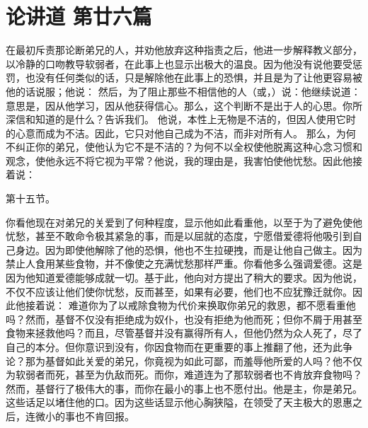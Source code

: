 
\section{论讲道 第廿六篇}

\par

 \par

在最初斥责那论断弟兄的人，并劝他放弃这种指责之后，他进一步解释教义部分，以冷静的口吻教导软弱者，在此事上也显示出极大的温良。因为他没有说他要受惩罚，也没有任何类似的话，只是解除他在此事上的恐惧，并且是为了让他更容易被他的话说服；他说： 然后，为了阻止那些不相信他的人（或，）说：他继续说道： 意思是，因从他学习，因从他获得信心。那么，这个判断不是出于人的心思。你所深信和知道的是什么？告诉我们。 他说，本性上无物是不洁的，但因人使用它时的心意而成为不洁。因此，它只对他自己成为不洁，而非对所有人。 那么，为何不纠正你的弟兄，使他认为它不是不洁的？为何不以全权使他脱离这种心念习惯和观念，使他永远不将它视为平常？他说，我的理由是，我害怕使他忧愁。因此他接着说：\par

第十五节。 \par

你看他现在对弟兄的关爱到了何种程度，显示他如此看重他，以至于为了避免使他忧愁，甚至不敢命令极其紧急的事，而是以屈就的态度，宁愿借爱德将他吸引到自己身边。因为即使他解除了他的恐惧，他也不生拉硬拽，而是让他自己做主。因为禁止人食用某些食物，并不像使之充满忧愁那样严重。你看他多么强调爱德。这是因为他知道爱德能够成就一切。基于此，他向对方提出了稍大的要求。因为他说，不仅不应该让他们使你忧愁，反而甚至，如果有必要，他们也不应犹豫迁就你。因此他接着说： 难道你为了以戒除食物为代价来换取你弟兄的救恩，都不愿看重他吗？然而，基督不仅没有拒绝成为奴仆，也没有拒绝为他而死；但你不屑于用甚至食物来拯救他吗？而且，尽管基督并没有赢得所有人，但他仍然为众人死了，尽了自己的本分。但你意识到没有，你因食物而在更重要的事上推翻了他，还为此争论？那为基督如此关爱的弟兄，你竟视为如此可鄙，而羞辱他所爱的人吗？他不仅为软弱者而死，甚至为仇敌而死。而你，难道连为了那软弱者也不肯放弃食物吗？然而，基督行了极伟大的事，而你在最小的事上也不愿付出。他是主，你是弟兄。这些话足以堵住他的口。因为这些话显示他心胸狭隘，在领受了天主极大的恩惠之后，连微小的事也不肯回报。\par

